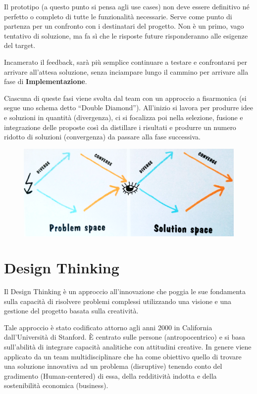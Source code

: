 Il prototipo (a questo punto si pensa agli use cases) non deve essere definitivo né perfetto o completo di tutte le funzionalità necessarie.
Serve come punto di partenza per un confronto con i destinatari del progetto. Non è un primo, vago tentativo di soluzione, ma fa sì che le risposte
future risponderanno alle esigenze del target.

Incamerato il feedback, sarà più semplice continuare a testare e confrontarsi per arrivare all'attesa soluzione, senza inciampare lungo il cammino
per arrivare alla fase di \textbf{Implementazione}.

Ciascuna di queste fasi viene svolta dal team con un approccio a fisarmonica (si segue uno schema detto ``Double Diamond''). All'inizio si lavora per
produrre idee e soluzioni in quantità (divergenza), ci si focalizza poi nella selezione, fusione e integrazione delle proposte così da distillare i
risultati e produrre un numero ridotto di soluzioni (convergenza) da passare alla fase successiva.

\begin{figure}[!h]
	\centering
	\includegraphics[width=\textwidth]{immagini/double-diamond.png}
\end{figure}

\section{Design Thinking}
Il Design Thinking è un approccio all’innovazione che poggia le sue fondamenta sulla capacità di risolvere problemi complessi utilizzando una visione e
una gestione del progetto basata sulla creatività. 

Tale approccio è stato codificato attorno agli anni 2000 in California dall’Università di Stanford. È centrato sulle persone (antropocentrico) e si
basa sull’abilità di integrare capacità analitiche con attitudini creative. In genere viene applicato da un team multidisciplinare che ha come
obiettivo quello di trovare una soluzione innovativa ad un problema (disruptive) tenendo conto del gradimento (Human-centered) di essa, della
redditività indotta e della sostenibilità economica (business).

